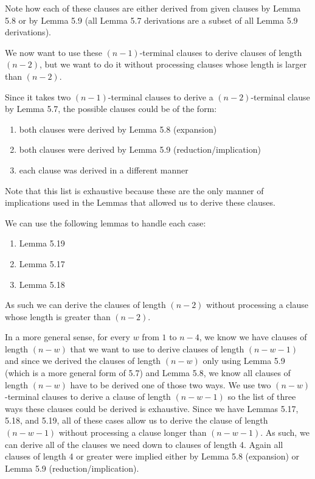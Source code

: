 \documentclass[manuscript]{acmart}
\begin{document}
    Note how each of these clauses are either derived from given clauses
    by Lemma 5.8 or by Lemma 5.9 (all Lemma 5.7 derivations are a subset
    of all Lemma 5.9 derivations).

    We now want to use these $(n-1)$-terminal clauses to derive clauses
    of length $(n-2)$, but we want to do it without processing clauses
    whose length is larger than $(n-2)$.

    Since it takes two $(n-1)$-terminal clauses to derive a $(n-2)$-terminal
    clause by Lemma 5.7, the possible clauses could be of the form:

    \begin{enumerate}
        \item both clauses were derived by Lemma 5.8 (expansion)
        \item both clauses were derived by Lemma 5.9 (reduction/implication)
        \item each clause was derived in a different manner
    \end{enumerate}

    Note that this list is exhaustive because these are the only manner
    of implications used in the Lemmas that allowed us to derive these clauses.

    We can use the following lemmas to handle each case:

    \begin{enumerate}
        \item Lemma 5.19
        \item Lemma 5.17
        \item Lemma 5.18
    \end{enumerate}

    As such we can derive the clauses of length $(n - 2)$ without processing
    a clause whose length is greater than $(n - 2)$.

    In a more general sense, for every $w$ from $1$ to $n-4$, 
    we know we have clauses of length $(n-w)$ that we want to use to
    derive clauses of length $(n-w-1)$ and since we derived the clauses
    of length $(n-w)$ only using Lemma 5.9 (which is a more general form
    of 5.7) and Lemma 5.8, we know all clauses of length $(n-w)$ have to
    be derived one of those two ways. We use two $(n-w)$-terminal clauses to 
    derive a clause of length $(n-w-1)$ so the list of three ways these
    clauses could be derived is exhaustive. Since we have Lemmas 5.17, 
    5.18, and 5.19, all of these cases allow us to derive the clause
    of length $(n-w-1)$ without processing a clause longer than $(n-w-1)$.
    As such, we can derive all of the clauses we need down to clauses
    of length 4. Again all clauses of length 4 or greater were
    implied either by Lemma 5.8 (expansion) or Lemma 5.9 (reduction/implication).
\end{document}
